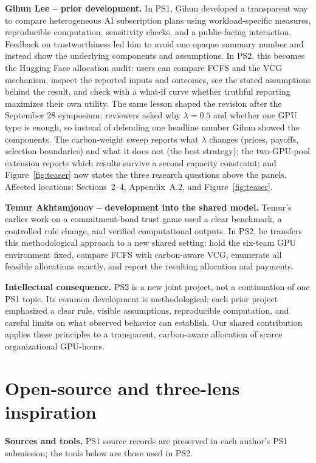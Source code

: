 \textbf{Gihun Lee -- prior development.} In PS1, Gihun developed a transparent way to compare heterogeneous AI subscription plans using workload-specific measures, reproducible computation, sensitivity checks, and a public-facing interaction. Feedback on trustworthiness led him to avoid one opaque summary number and instead show the underlying components and assumptions. In PS2, this becomes the Hugging Face allocation audit: users can compare FCFS and the VCG mechanism, inspect the reported inputs and outcomes, see the stated assumptions behind the result, and check with a what-if curve whether truthful reporting maximizes their own utility. The same lesson shaped the revision after the September 28 symposium: reviewers asked why $\lambda=0.5$ and whether one GPU type is enough, so instead of defending one headline number Gihun showed the components. The carbon-weight sweep reports what $\lambda$ changes (prices, payoffs, selection boundaries) and what it does not (the best strategy); the two-GPU-pool extension reports which results survive a second capacity constraint; and Figure~\ref{fig:teaser} now states the three research questions above the panels. Affected locations: Sections~2--4, Appendix~A.2, and Figure~\ref{fig:teaser}.

\textbf{Temur Akhtamjonov -- development into the shared model.} Temur's earlier work on a commitment-bond trust game used a clear benchmark, a controlled rule change, and verified computational outputs. In PS2, he transfers this methodological approach to a new shared setting: hold the six-team GPU environment fixed, compare FCFS with carbon-aware VCG, enumerate all feasible allocations exactly, and report the resulting allocation and payments.

\textbf{Intellectual consequence.} PS2 is a new joint project, not a continuation of one PS1 topic. Its common development is methodological: each prior project emphasized a clear rule, visible assumptions, reproducible computation, and careful limits on what observed behavior can establish. Our shared contribution applies these principles to a transparent, carbon-aware allocation of scarce organizational GPU-hours.

\section{Open-source and three-lens inspiration}
\textbf{Sources and tools.} PS1 source records are preserved in each author's PS1 submission; the tools below are those used in PS2.

